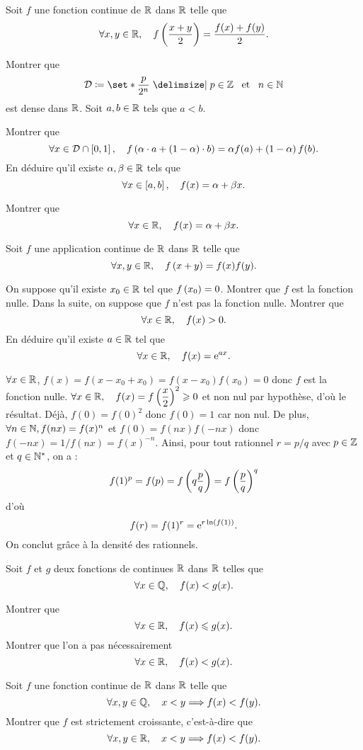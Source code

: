 \documentclass{magnolia}
\begin{document}
Soit $f$ une fonction continue de $\mathbb{R}$ dans $\mathbb{R}$ telle que
\[\forall x,y\in\mathbb{R} ,\quad f\left(\frac{x+y}{2}\right)=\frac{f(x)+f(y)}{2}.\]
\begin{questions}
\question Montrer que
  \[\mathcal{D}\defeq\enstq{\frac{p}{2^n}}{p\in\Z \et n\in\N}\]
  est dense dans $\mathbb{R}$.
\question Soit $a,b\in\mathbb{R}$ tels que $a<b$.
  \begin{questions}
  \question Montrer que
    \[\forall x\in\mathcal{D}\cap\left[0,1\right] ,\quad
      f\left(\alpha\cdot a +\left(1-\alpha\right) \cdot b\right)=\alpha f(a)+
      \left(1-\alpha\right) f(b).\]
  \question En déduire qu'il existe $\alpha,\beta\in\mathbb{R}$ tels que
    \[\forall x\in\left[a,b\right] ,\quad f(x)=\alpha+\beta x.\]
  \end{questions}
\question Montrer que
  \[\forall x\in\mathbb{R} ,\quad f(x)=\alpha+\beta x.\]
\end{questions}

Soit $f$ une application continue de $\mathbb{R}$ dans $\mathbb{R}$ telle que
\[\forall x,y\in\mathbb{R} ,\quad f\left(x+y\right)=f(x)f(y).\]
\begin{questions}
\question On suppose qu'il existe $x_0\in\mathbb{R}$ tel que $f\left(x_0\right)=0$. Montrer que
  $f$ est la fonction nulle.
\enonce Dans la suite, on suppose que $f$ n'est pas la fonction nulle.
\question Montrer que
  \[\forall x\in\mathbb{R} ,\quad f(x)>0.\]
\question En déduire qu'il existe $a\in\mathbb{R}$ tel que
  \[\forall x\in\mathbb{R} ,\quad f(x)={\rm e}^{ax}.\]
\end{questions}

\begin{sol}
\begin{questions}
\question $\forall x \in \mathbb{R}$, $f(x)=f(x-x_0+x_0)=f(x-x_0)f(x_0)=0$ donc $f$ est la fonction nulle.
\question $\forall x\in\mathbb{R} ,\quad f(x)=f\left(\dfrac{x}{2}\right)^2\geqslant 0$ et non nul par hypothèse, d'où le résultat.
\question Déjà, $f(0)=f(0)^2$ donc $f(0)=1$ car non nul. De plus, $\forall n \in \mathbb{N}, f(nx)=f(x)^n$ et $f(0)=f(nx)f(-nx)$ donc $f(-nx)=1/f(nx)=f(x)^{-n}$. 
Ainsi, pour tout rationnel $r=p/q$ avec $p\in \mathbb{Z}$ et $q\in {\mathbb{N}^*}$, on a :
$$f(1)^p=f(p)=f\left(q\frac{p}{q}\right)=f\left(\frac{p}{q}\right)^q$$ d'où $$f(r)=f(1)^r={\rm e}^{r\ln(f(1))}.$$
On conclut grâce à la densité des rationnels.
\end{questions}


\end{sol}

\begin{questions}
\question Soit $f$ et $g$ deux fonctions de continues $\mathbb{R}$ dans $\mathbb{R}$ telles
  que
  \[\forall x\in\mathbb{Q} ,\quad f(x)<g(x).\]
  \begin{questions}
  \question Montrer que
    \[\forall x\in\mathbb{R} ,\quad f(x)\leqslant g(x).\]
  \question Montrer que l'on a pas nécessairement
    \[\forall x\in\mathbb{R} ,\quad f(x)<g(x).\]
  \end{questions}
\question Soit $f$ une fonction continue de $\mathbb{R}$ dans $\mathbb{R}$ telle que
  \[\forall x,y\in\mathbb{Q} ,\quad x<y \Longrightarrow f(x)<f(y).\]
  Montrer que $f$ est strictement croissante, c'est-à-dire que
  \[\forall x,y\in\mathbb{R} ,\quad x<y \Longrightarrow f(x)<f(y).\]
\end{questions}
\end{document}
